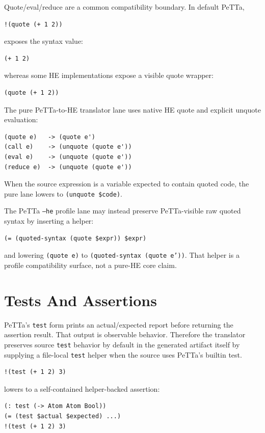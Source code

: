 \documentclass[11pt]{article}
\newcommand{\code}[1]{\texttt{#1}}
\newcommand{\HE}{\textup{HE}}
\newcommand{\PeTTa}{\textup{PeTTa}}
\begin{document}
Quote/eval/reduce are a common compatibility boundary.  In default \PeTTa{},
\begin{lstlisting}
!(quote (+ 1 2))
\end{lstlisting}
exposes the syntax value:
\begin{lstlisting}
(+ 1 2)
\end{lstlisting}
whereas some \HE{} implementations expose a visible quote wrapper:
\begin{lstlisting}
(quote (+ 1 2))
\end{lstlisting}

The pure \PeTTa{}-to-\HE{} translator lane uses native \HE{} quote and explicit
unquote evaluation:
\begin{lstlisting}
(quote e)   -> (quote e')
(call e)    -> (unquote (quote e'))
(eval e)    -> (unquote (quote e'))
(reduce e)  -> (unquote (quote e'))
\end{lstlisting}
When the source expression is a variable expected to contain quoted code, the
pure lane lowers to \code{(unquote \$code)}.

The \PeTTa{} \code{--he} profile lane may instead preserve \PeTTa{}-visible raw
quoted syntax by inserting a helper:
\begin{lstlisting}
(= (quoted-syntax (quote $expr)) $expr)
\end{lstlisting}
and lowering \code{(quote e)} to
\code{(quoted-syntax (quote e'))}.  That helper is a profile compatibility
surface, not a pure-\HE{} core claim.

\section{Tests And Assertions}

\PeTTa{}'s \code{test} form prints an actual/expected report before returning
the assertion result.  That output is observable behavior.  Therefore the
translator preserves source \code{test} behavior by default in the generated
artifact itself by supplying a file-local \code{test} helper when the source
uses \PeTTa{}'s builtin test.

\begin{lstlisting}
!(test (+ 1 2) 3)
\end{lstlisting}

lowers to a self-contained helper-backed assertion:

\begin{lstlisting}
(: test (-> Atom Atom Bool))
(= (test $actual $expected) ...)
!(test (+ 1 2) 3)
\end{lstlisting}
\end{document}
